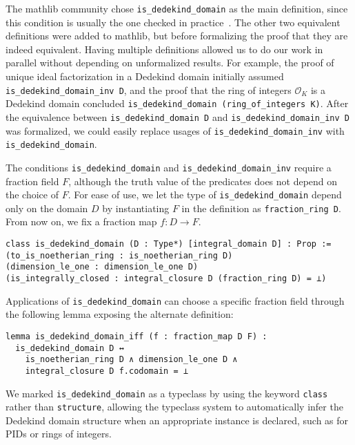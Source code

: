 \documentclass[a4paper,USenglish,cleveref, autoref, thm-restate]{lipics-v2021}
\newcommand{\lean}[1]{\texttt{#1}\xspace} %
\newcommand*{\OK}[1][K]{\mathcal{O}_{#1}}
\newcommand{\mathlib}{\textsf{mathlib}\xspace}
\begin{document}
The mathlib community chose \lean{is\_dedekind\_domain} as the main definition,
since this condition is usually the one checked in practice~\cite{Neukirch}.
The other two equivalent definitions were added to \mathlib, but before formalizing the proof that they are indeed equivalent.
Having multiple definitions allowed us to do our work in parallel without depending on unformalized results.
For example,
the proof of unique ideal factorization in a Dedekind domain initially assumed \lean{is\_dedekind\_domain\_inv D},
and the proof that the ring of integers $\OK$ is a Dedekind domain concluded \lean{is\_dedekind\_domain (ring\_of\_integers K)}.
After the equivalence between \lean{is\_dedekind\_domain D} and \lean{is\_dedekind\_domain\_inv D} was formalized,
we could easily replace usages of \lean{is\_dedekind\_domain\_inv} with \lean{is\_dedekind\_domain}.

The conditions \lean{is\_dedekind\_domain} and \lean{is\_dedekind\_domain\_inv} require a fraction field $F$,
although the truth value of the predicates does not depend on the choice of $F$.
For ease of use, we let the type of \lean{is\_dedekind\_domain} depend only on the domain $D$
by instantiating $F$ in the definition as \lean{fraction\_ring D}. From now on, we fix a fraction map $f\colon D\to F$.
\begin{lstlisting}
class is_dedekind_domain (D : Type*) [integral_domain D] : Prop :=
(to_is_noetherian_ring : is_noetherian_ring D)
(dimension_le_one : dimension_le_one D)
(is_integrally_closed : integral_closure D (fraction_ring D) = ⊥)
\end{lstlisting}
Applications of \lean{is\_dedekind\_domain} can choose a specific fraction field through the following lemma exposing the alternate definition:
\begin{lstlisting}
lemma is_dedekind_domain_iff (f : fraction_map D F) :
  is_dedekind_domain D ↔
    is_noetherian_ring D ∧ dimension_le_one D ∧
    integral_closure D f.codomain = ⊥
\end{lstlisting}

We marked \lean{is\_dedekind\_domain} as a typeclass by using the keyword \lean{class} rather than \lean{structure},
allowing the typeclass system to automatically infer the Dedekind domain structure when an appropriate instance is declared, such as for PIDs or rings of integers.
\end{document}
